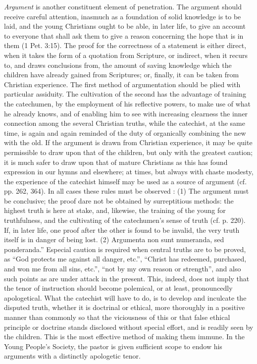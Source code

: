 \emph{Argument} is another constituent element of penetration. The argument should receive careful attention, inasmuch as a foundation of solid knowledge is to be laid, and the young Christians ought to be able, in later life, to give an account to everyone that shall ask them to give a reason concerning the hope that is in them (1 Pet. 3:15). The proof for the correctness of a statement is either direct, when it takes the form of a quotation from Scripture, or indirect, when it recurs to, and draws conclusions from, the amount of saving knowledge which the children have already gained from Scriptures; or, finally, it can be taken from Christian experience. The first method of argumentation should be plied with particular assiduity. The cultivation of the second has the advantage of training the catechumen, by the employment of his reflective powers, to make use of what he already knows, and of enabling him to see with increasing clearness the inner connection among the several Christian truths, while the catechist, at the same time, is again and again reminded of the duty of organically combining the new with the old. If the argument is drawn from Christian experience, it may be quite permissible to draw upon that of the children, but only with the greatest caution; it is much safer to draw upon that of mature Christians as this has found expression in our hymns and elsewhere; at times, but always with chaste modesty, the experience of the catechist himself may be used as a source of argument (cf. pp. 262, 364). In all cases these
rules must be observed : (1) The argument must be conclusive; the proof dare not be obtained by surreptitious methods: the highest truth is here at stake, and, likewise, the training of the young for truthfulness, and the cultivating of the catechumen’s sense of truth (cf. p. 220). If, in later life, one proof after the other is found to be invalid, the very truth itself is in danger of being lost. (2) Argumenta non sunt numeranda, sed ponderanda.” Especial caution is required when central truths are to be proved, as “God protects me against all danger, etc.”, “Christ has redeemed, purchased, and won me from all sins, etc.”, “not by my own reason or strength”, and also such points as are under attack in the present. This, indeed, does not imply that the tenor of instruction should become polemical, or at least, pronouncedly apologetical. What the catechist will have to do, is to develop and inculcate the disputed truth, whether it is doctrinal or ethical, more thoroughly in a positive manner than commonly so that the viciousness of this or that false ethical principle or doctrine stands disclosed without special effort, and is readily seen by the children. This is the most effective method of making them immune. In the Young People’s Society, the pastor is given sufficient scope to endow his arguments with a distinctly apologetic tenor.

